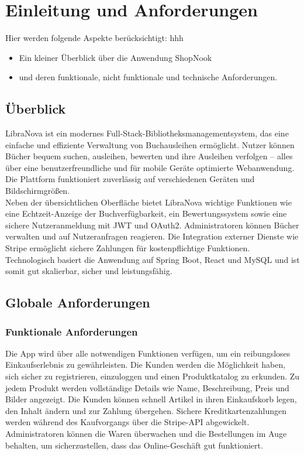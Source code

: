 \chapter{Einleitung und Anforderungen}
Hier werden folgende Aspekte berücksichtigt: hhh
\begin{itemize}
	\item Ein kleiner Überblick über die Anwendung ShopNook
	\item und deren funktionale, nicht funktionale und technische Anforderungen.
\end{itemize}

\section{Überblick}

LibraNova ist ein modernes Full-Stack-Bibliotheksmanagementsystem, das eine einfache und effiziente Verwaltung von Buchausleihen ermöglicht. Nutzer können Bücher bequem suchen, ausleihen, bewerten und ihre Ausleihen verfolgen – alles über eine benutzerfreundliche und für mobile Geräte optimierte Webanwendung. Die Plattform funktioniert zuverlässig auf verschiedenen Geräten und Bildschirmgrößen.\\
Neben der übersichtlichen Oberfläche bietet LibraNova wichtige Funktionen wie eine Echtzeit-Anzeige der Buchverfügbarkeit, ein Bewertungssystem sowie eine sichere Nutzeranmeldung mit JWT und OAuth2. Administratoren können Bücher verwalten und auf Nutzeranfragen reagieren. Die Integration externer Dienste wie Stripe ermöglicht sichere Zahlungen für kostenpflichtige Funktionen. Technologisch basiert die Anwendung auf Spring Boot, React und MySQL und ist somit gut skalierbar, sicher und leistungsfähig.

\section{Globale Anforderungen}

\subsection{Funktionale Anforderungen}

Die App wird über alle notwendigen Funktionen verfügen, um ein reibungsloses Einkaufserlebnis zu gewährleisten. Die Kunden werden die Möglichkeit haben, sich sicher zu registrieren, einzuloggen und einen Produktkatalog zu erkunden. Zu jedem Produkt werden vollständige Details wie Name, Beschreibung, Preis und Bilder angezeigt. Die Kunden können schnell Artikel in ihren Einkaufskorb legen, den Inhalt ändern und zur Zahlung übergehen. Sichere Kreditkartenzahlungen werden während des Kaufvorgangs über die Stripe-API abgewickelt. Administratoren können die Waren überwachen und die Bestellungen im Auge behalten, um sicherzustellen, dass das Online-Geschäft gut funktioniert. 

